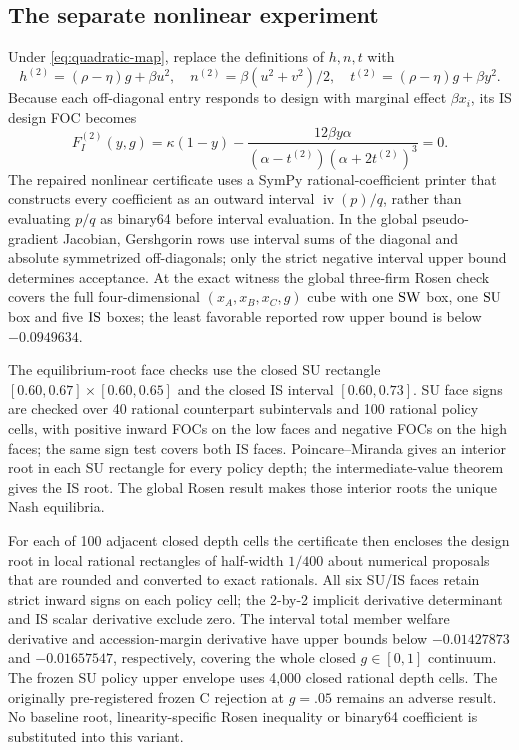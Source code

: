 \subsection{The separate nonlinear experiment}

Under \eqref{eq:quadratic-map}, replace the definitions of
$h,n,t$ with
\[
 h^{(2)}=(\rho-\eta)g+\beta u^2,\quad
 n^{(2)}=\beta(u^2+v^2)/2,\quad
 t^{(2)}=(\rho-\eta)g+\beta y^2.
\]
Because each off-diagonal entry responds to design
with marginal effect $\beta x_i$, its IS design FOC becomes
\[
 F_I^{(2)}(y,g)=\kappa(1-y)-
 \frac{12\beta y\alpha}
 {(\alpha-t^{(2)})(\alpha+2t^{(2)})^3}=0.
\]
The repaired nonlinear certificate uses a SymPy
rational-coefficient printer that constructs every
coefficient as an outward interval $\operatorname{iv}(p)/q$,
rather than evaluating $p/q$ as binary64 before
interval evaluation. In the global pseudo-gradient
Jacobian, Gershgorin rows use interval sums of
the diagonal and absolute symmetrized off-diagonals;
only the strict negative interval upper bound
determines acceptance. At the exact witness the
global three-firm Rosen check covers the full
four-dimensional $(x_A,x_B,x_C,g)$ cube with
one $\mathrm{SW}$ box, one $\mathrm{SU}$ box and five $\mathrm{IS}$
boxes; the least favorable reported row upper
bound is below $-0.0949634$.

The equilibrium-root face checks use the closed SU
rectangle $[0.60,0.67]\times[0.60,0.65]$ and
the closed IS interval $[0.60,0.73]$.
SU face signs are checked over 40 rational
counterpart subintervals and 100 rational
policy cells, with positive inward FOCs on
the low faces and negative FOCs on the high faces;
the same sign test covers both IS faces.
Poincare--Miranda gives an interior root in
each SU rectangle for every policy depth;
the intermediate-value theorem gives the IS
root. The global Rosen result makes those
interior roots the unique Nash equilibria.

For each of 100 adjacent closed depth cells
the certificate then encloses the design root
in local rational rectangles of half-width
$1/400$ about numerical proposals that are
rounded and converted to exact rationals.
All six SU/IS faces retain strict inward signs
on each policy cell; the 2-by-2 implicit
derivative determinant and IS scalar derivative
exclude zero. The interval total member
welfare derivative and accession-margin derivative
have upper bounds below $-0.01427873$ and
$-0.01657547$, respectively, covering the
whole closed $g\in[0,1]$ continuum.
The frozen SU policy upper envelope uses 4,000
closed rational depth cells. The originally
pre-registered frozen C rejection at $g=.05$
remains an adverse result. No baseline root,
linearity-specific Rosen inequality or binary64
coefficient is substituted into this variant.

